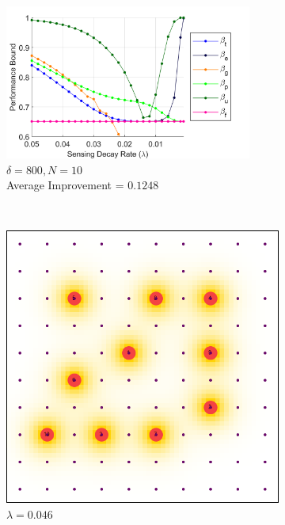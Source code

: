 \documentclass[conference]{IEEEtran}
\begin{document}
\begin{figure}[!h]
    \centering
    \begin{subfigure}[t]{\columnwidth}
        \centering
        \includegraphics[width=3.2in]{Figures/Blank2.png}
        \caption{$\delta=800, N=10$ \\ Average Improvement = $0.1248$}
    \end{subfigure}%
    \\
    \centering
    \begin{subfigure}[t]{0.105\textwidth}
        \centering
        \includegraphics[width=\textwidth]{Figures/Blank2_1.png}
        \caption{$\lambda=0.046$}
    \end{subfigure}\hspace{3mm}
    \begin{subfigure}[t]{0.105\textwidth}
        \centering

\end{subfigure}
\end{figure}
\end{document}
